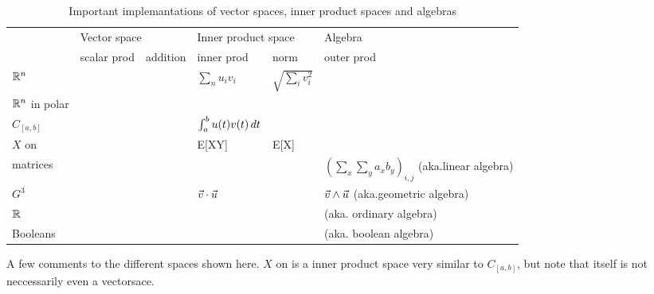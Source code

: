 \begin{table}[ht]
\centering
\caption{Important implemantations of vector spaces, inner product spaces and algebras}
\begin{tabular}{@{}llllll@{}}
\toprule
                    & \multicolumn{2}{l}{Vector space} & \multicolumn{2}{l}{Inner product space}            & Algebra                                                  \\ 
                    & scalar prod      & addition      & inner prod                     & norm                   & outer prod                                               \\ 
\midrule
$\mathbb{R}^n$          &                  &               & $\sum_n u_i v_i$               & $\sqrt{\sum_i v_i^2}$  &                                                          \\
$\mathbb{R}^n$ in polar &                  &               &                                &                        &                                                          \\
$C_{[a,b]}$         &                  &               & $\int_a^b u(t) v(t) \mathop{dt} $ &                        &                                                          \\
$X$ on \samplespace &                  &               & E[XY]                          & E[X]                   &                                                          \\
matrices            &                  &               &                                &                        & $(\sum_x \sum_y a_x b_y)_{i,j}$ (aka.linear algebra)     \\
$G^3$               &                  &               &$\vec{v} \cdot \vec{u}$    &                        & $\vec{v} \wedge \vec{u}$ (aka.geometric algebra)     \\
$\mathbb{R}$            &                  &               &                                &                        & (aka. ordinary algebra)                                  \\
Booleans            &                  &               &                                &                        & (aka. boolean algebra)                                   \\
\bottomrule
\end{tabular}

\vspace{1ex}
\raggedright \begin{footnotesize} A few comments to the different spaces shown here. $X$ on \samplespace is a inner product space very similar to $C_{[a,b]}$, but note that \samplespace itself is not neccessarily even a vectorsace. \end{footnotesize}

\end{table}

